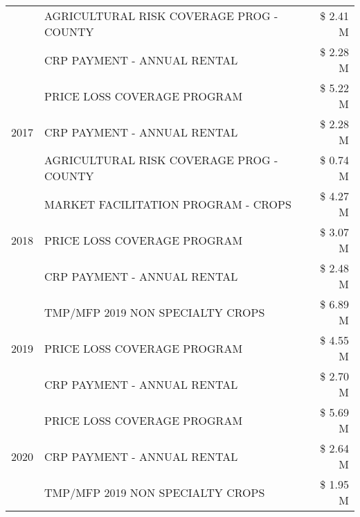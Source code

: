 \begin{tabular}{llr}
 & AGRICULTURAL RISK COVERAGE PROG - COUNTY & \$ 2.41 M \\
 & CRP PAYMENT - ANNUAL RENTAL & \$ 2.28 M \\
\cline{1-3}
\multirow[t]{3}{*}{2017} & PRICE LOSS COVERAGE PROGRAM & \$ 5.22 M \\
 & CRP PAYMENT - ANNUAL RENTAL & \$ 2.28 M \\
 & AGRICULTURAL RISK COVERAGE PROG - COUNTY & \$ 0.74 M \\
\cline{1-3}
\multirow[t]{3}{*}{2018} & MARKET FACILITATION PROGRAM - CROPS & \$ 4.27 M \\
 & PRICE LOSS COVERAGE PROGRAM & \$ 3.07 M \\
 & CRP PAYMENT - ANNUAL RENTAL & \$ 2.48 M \\
\cline{1-3}
\multirow[t]{3}{*}{2019} & TMP/MFP 2019 NON SPECIALTY CROPS & \$ 6.89 M \\
 & PRICE LOSS COVERAGE PROGRAM & \$ 4.55 M \\
 & CRP PAYMENT - ANNUAL RENTAL & \$ 2.70 M \\
\cline{1-3}
\multirow[t]{3}{*}{2020} & PRICE LOSS COVERAGE PROGRAM & \$ 5.69 M \\
 & CRP PAYMENT - ANNUAL RENTAL & \$ 2.64 M \\
 & TMP/MFP 2019 NON SPECIALTY CROPS & \$ 1.95 M \\
\cline{1-3}
\bottomrule
\end{tabular}
